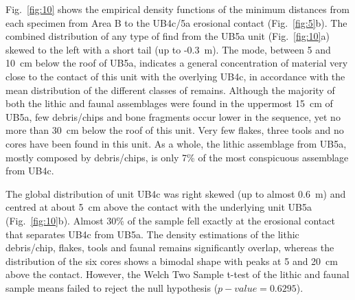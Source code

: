 \documentclass[preprint,authoryear,times]{elsarticle} %
\begin{document}

Fig.~\ref{fig:10} shows the empirical density functions of the minimum distances from each specimen from Area B to the UB4c/5a erosional contact (Fig.~\ref{fig:5}b). The combined distribution of any type of find from the UB5a unit (Fig.~\ref{fig:10}a) skewed to the left with a short tail (up to -0.3~m). The mode, between 5 and 10~cm below the roof of UB5a, indicates a general concentration of material very close to the contact of this unit with the overlying UB4c, in accordance with the mean distribution of the different classes of remains. %
Although the majority of both the lithic and faunal assemblages were found in the uppermost 15~cm of UB5a, few debris/chips and bone fragments occur lower in the sequence, yet no more than 30~cm below the roof of this unit. Very few flakes, three tools and no cores have been found in this unit. As a whole, the lithic assemblage from UB5a, mostly composed by debris/chips, is only 7\% of the most conspicuous assemblage from UB4c.

The global distribution of unit UB4c was right skewed (up to almost 0.6~m) and centred at about 5~cm above the contact with the underlying unit UB5a (Fig.~\ref{fig:10}b). Almost 30\% of the sample fell exactly at the erosional contact that separates UB4c from UB5a. The density estimations of the lithic debris/chip, flakes, tools and faunal remains significantly overlap, whereas the distribution of the six cores shows a bimodal shape with peaks at 5 and 20~cm above the contact. However, the Welch Two Sample t-test of the lithic and faunal sample means failed to reject the null hypothesis ($p-value=0.6295$). %
\end{document}
